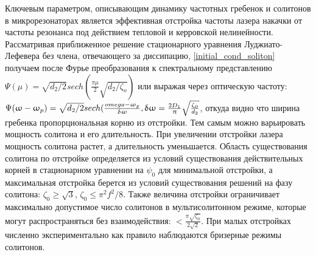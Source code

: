 Ключевым параметром, описывающим динамику частотных гребенок и солитонов в микрорезонаторах является эффективная отстройка частоты лазера накачки от частоты резонанса под действием тепловой и керровской нелинейности. Рассматривая приближенное решение стационарного уравнения Луджиато-Лефевера без члена, отвечающего за диссипацию, \ref{initial_cond_soliton} получаем после Фурье преобразования к спектральному представлению $\Psi(\mu)=\sqrt{d_2/2} sech(\frac{\pi\mu}{2}\sqrt{d_2/\zeta_o})$ или выражая через оптическую частоту: $\Psi(\omega-\omega_p)=\sqrt{d_2/2} sech(\frac{\\omega-\omega_p}{\delta\omega}, \delta\omega=\frac{2D_1}{\pi}\sqrt{\frac{\zeta_0}{d_2}}$, откуда видно что ширина гребенка пропорциональная корню из отстройки. Тем самым можно варьировать мощность солитона и его длительность. При увеличении отстройки лазера мощность солитона растет, а длительность уменьшается. Область существования солитона по отстройке определяется из условий существования действительных корней в стационарном уравнении на $\psi_0$ для минимальной отстройки, а максимальная отстройка берется из условий существования решений на фазу солитона: $\zeta_0\geq\sqrt{3}$, $\zeta_0\leq \pi^2 f^2/8$. Также величина отстройки ограничивает максимально допустимое число солитонов в мультисолитонном режиме, которые могут распространяться без взаимодействия: $<\frac{\pi\sqrt{\zeta_0}}{2\sqrt{2}}$. При малых отстройках численно экспериментально как правило наблюдаются бризерные режимы солитонов.

